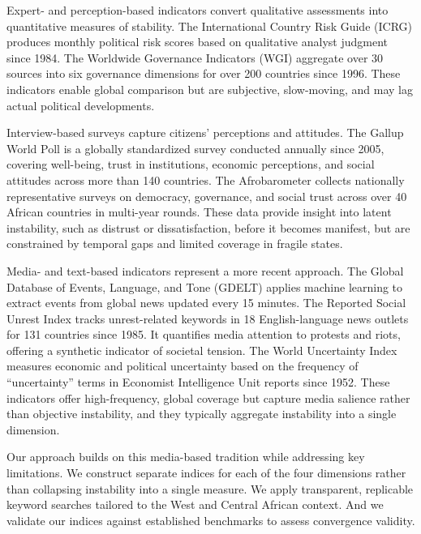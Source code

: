 \documentclass[12pt,a4paper,fleqn]{article}
\begin{document}
Expert- and perception-based indicators convert qualitative assessments into quantitative measures of stability. The International Country Risk Guide (ICRG) \citep{howell2011} produces monthly political risk scores based on qualitative analyst judgment since 1984. The Worldwide Governance Indicators (WGI) \citep{kaufmann2011} aggregate over 30 sources into six governance dimensions for over 200 countries since 1996. These indicators enable global comparison but are subjective, slow-moving, and may lag actual political developments.

Interview-based surveys capture citizens' perceptions and attitudes. The Gallup World Poll \citep{tortora2010} is a globally standardized survey conducted
annually since 2005, covering well-being, trust in institutions, economic perceptions, and social attitudes across more than 140 countries. The Afrobarometer \citep{mattes2008} collects nationally representative surveys on democracy, governance, and social trust across over 40 African countries in multi-year rounds. These data provide insight into latent instability, such as distrust or dissatisfaction, before it becomes manifest, but are constrained by temporal gaps and limited coverage in fragile states. 

Media- and text-based indicators represent a more recent approach. The Global Database of Events, Language, and Tone (GDELT) \citep{ward2013} applies machine learning to extract events from global news updated every 15 minutes. The Reported Social Unrest Index \citep{BARRETT2022} tracks unrest-related keywords in 18 English-language news outlets for 131 countries since 1985. It quantifies media attention to protests and riots, offering a synthetic indicator of societal
tension. The World Uncertainty Index \citep{AHIR2022} measures economic and political uncertainty based on the frequency of ``uncertainty'' terms in Economist Intelligence Unit reports since 1952. These indicators offer high-frequency, global coverage but capture media salience rather than objective instability, and they typically aggregate instability into a single dimension.

Our approach builds on this media-based tradition while addressing key limitations. We construct separate indices for each of the four \cite{JONGAPIN2009} dimensions rather than collapsing instability into a single measure. We apply transparent, replicable keyword searches tailored to the West and Central African context. And we validate our indices against established benchmarks to assess convergence validity.
\end{document}
